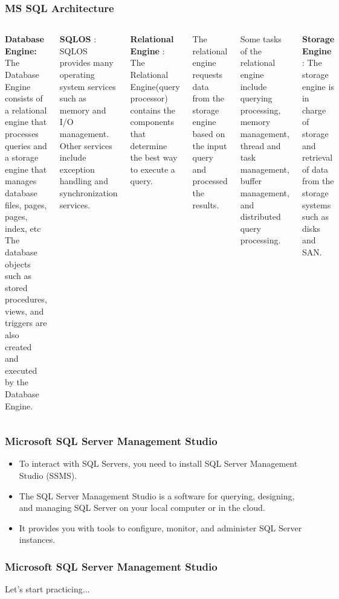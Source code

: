 \begin{frame}
	\frametitle{MS SQL Architecture}
	
	\begin{columns}
		
		
\textbf{Database Engine:}  The Database Engine consists of a relational engine that processes queries and a storage engine that manages database files, pages, pages, index, etc
The database objects such as stored procedures, views, and triggers are also created and executed by the Database Engine.

\textbf{SQLOS} : SQLOS provides many operating system services such as memory and I/O management. Other services include exception handling and synchronization services.
	


		
		

		
		\textbf{Relational Engine} : The Relational Engine(query processor) contains the components that determine the best way to execute a query.
		
		The relational engine requests data from the storage engine based on the input query and processed the results.
		
		Some tasks of the relational engine include querying processing, memory management, thread and task management, buffer management, and distributed query processing.
		
		\textbf{Storage Engine} : The storage engine is in charge of storage and retrieval of data from the storage systems such as disks and SAN.
					
	\end{columns}
\end{frame}

\begin{frame}
	
	\frametitle{Microsoft SQL Server Management Studio}
	
	\begin{itemize}
		
		\item To interact with SQL Servers, you need to install SQL Server Management Studio (SSMS).
		
		\item  The SQL Server Management Studio is a software for querying, designing, and managing SQL Server on your local computer or in the cloud. 
		
		\item It provides you with tools to configure, monitor, and administer SQL Server instances.
		
	\end{itemize}
	
\end{frame}



\begin{frame}
	
	\frametitle{Microsoft SQL Server Management Studio}
		
		Let's start practicing...
		 
	

\end{frame}